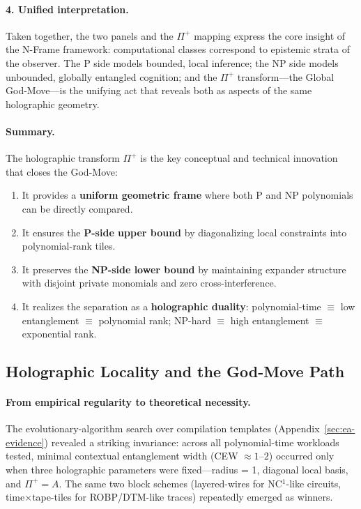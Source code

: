 \documentclass[12pt]{article}
\theoremstyle{definition}
\theoremstyle{definition}
\theoremstyle{remark}
\theoremstyle{remark}
\begin{document}
\paragraph{4. Unified interpretation.}
Taken together, the two panels and the $\Pi^{+}$ mapping express the core insight
of the N-Frame framework:
computational classes correspond to epistemic strata of the observer.
The P side models bounded, local inference; the NP side models unbounded,
globally entangled cognition; and the $\Pi^{+}$ transform---the Global God-Move---is
the unifying act that reveals both as aspects of the same holographic geometry.


\paragraph{Summary.}
The holographic transform $\Pi^+$ is the key conceptual and technical innovation that closes the God-Move:
\begin{enumerate}
\item It provides a \textbf{uniform geometric frame} where both P and NP polynomials can be directly compared.
\item It ensures the \textbf{P-side upper bound} by diagonalizing local constraints into polynomial-rank tiles.
\item It preserves the \textbf{NP-side lower bound} by maintaining expander structure with disjoint private monomials and zero cross-interference.
\item It realizes the separation as a \textbf{holographic duality}: polynomial-time $\equiv$ low entanglement $\equiv$ polynomial rank; NP-hard $\equiv$ high entanglement $\equiv$ exponential rank.
\end{enumerate}

\subsection{Holographic Locality and the God-Move Path}

\paragraph{From empirical regularity to theoretical necessity.}
The evolutionary-algorithm search over compilation templates (Appendix~\ref{sec:ea-evidence}) revealed a striking invariance: across all polynomial-time workloads tested, minimal contextual entanglement width (CEW $\approx 1$--$2$) occurred only when three holographic parameters were fixed---radius = 1, diagonal local basis, and $\Pi^+ = A$. The same two block schemes (layered-wires for NC$^1$-like circuits, time$\times$tape-tiles for ROBP/DTM-like traces) repeatedly emerged as winners.
\end{document}
